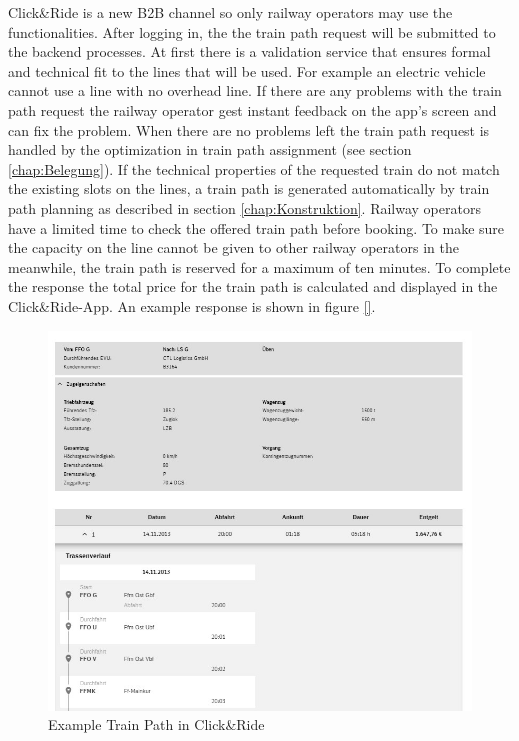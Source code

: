 Click\&Ride is a new B2B channel so only railway operators may use the functionalities. After logging in, the the train path request will be submitted to the backend processes. At first there is a validation service that ensures formal and technical fit to the lines that will be used. For example an electric vehicle cannot use a line with no overhead line. If there are any problems with the train path request the railway operator gest instant feedback on the app's screen and can fix the problem. When there are no problems left the train path request is handled by the optimization in train path assignment (see section \ref{chap:Belegung}). If the technical properties of the requested train do not match the existing slots on the lines, a train path is generated automatically by train path planning as described in section \ref{chap:Konstruktion}. Railway operators have a limited time to check the offered train path before booking. To make sure the capacity on the line cannot be given to other railway operators in the meanwhile, the train path is reserved for a maximum of ten minutes. To complete the response the total price for the train path is calculated and displayed in the Click\&Ride-App. An example response is shown in figure \ref{}.
\begin{figure}[htb]
	\centering
	\includegraphics[width=\textwidth]{Bilder/train_path.jpg}
	\caption{Example Train Path in Click\&Ride}
	\label{fig:process_sequence}
\end{figure}

